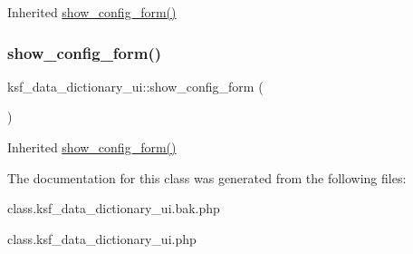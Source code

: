 Inherited \hyperlink{classksf__data__dictionary__ui_a3c01247145824cdf9ad196e2c1e1ad80}{show\+\_\+config\+\_\+form()} \hypertarget{classksf__data__dictionary__ui_a3c01247145824cdf9ad196e2c1e1ad80}{}\label{classksf__data__dictionary__ui_a3c01247145824cdf9ad196e2c1e1ad80} 
\subsubsection{\texorpdfstring{show\+\_\+config\+\_\+form()}{show\_config\_form()}\hspace{0.1cm}{\footnotesize\ttfamily [2/2]}}
{\footnotesize\ttfamily ksf\+\_\+data\+\_\+dictionary\+\_\+ui\+::show\+\_\+config\+\_\+form (\begin{DoxyParamCaption}{ }\end{DoxyParamCaption})}

Inherited \hyperlink{classksf__data__dictionary__ui_a3c01247145824cdf9ad196e2c1e1ad80}{show\+\_\+config\+\_\+form()} 

The documentation for this class was generated from the following files\+:\begin{DoxyCompactItemize}
\item 
class.\+ksf\+\_\+data\+\_\+dictionary\+\_\+ui.\+bak.\+php\item 
class.\+ksf\+\_\+data\+\_\+dictionary\+\_\+ui.\+php\end{DoxyCompactItemize}
